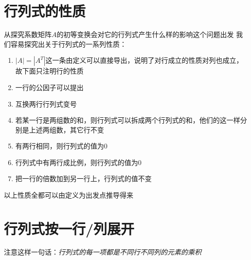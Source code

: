 \section{行列式的性质}
从探究系数矩阵$A$的初等变换会对它的行列式产生什么样的影响这个问题出发
我们容易探究出关于行列式的一系列性质：

\begin{enumerate}
    \item $|A| = |A^T|$这一条由定义可以直接导出，说明了对行成立的性质对列也成立，故下面只注明行的性质
    \item 一行的公因子可以提出
    \item 互换两行行列式变号
    \item 若某一行是两组数的和，则行列式可以拆成两个行列式的和，他们的这一样分别是上述两组数，其它行不变
    \item 有两行相同，则行列式的值为0
    \item 行列式中有两行成比例，则行列式的值为0
    \item 把一行的倍数加到另一行上，行列式的值不变
\end{enumerate}

以上性质全都可以由定义为出发点推导得来

\section{行列式按一行/列展开}
注意这样一句话：\emph{行列式的每一项都是不同行不同列的元素的乘积}